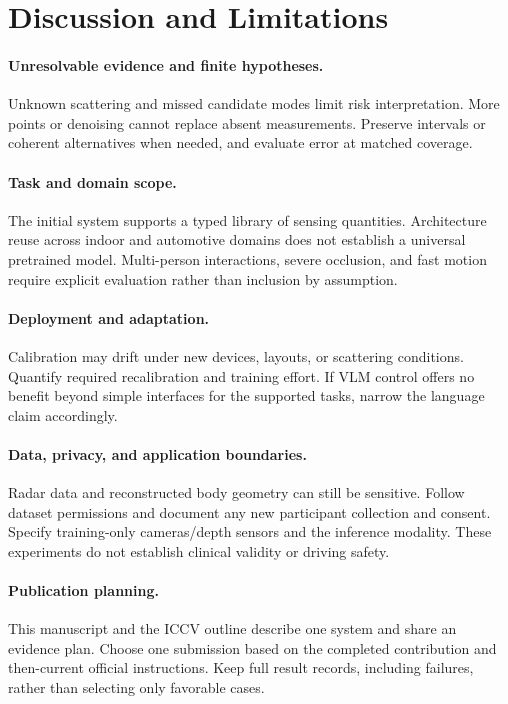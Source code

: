 \section{Discussion and Limitations}
\label{sec:discussion}
\paragraph{Unresolvable evidence and finite hypotheses.}
Unknown scattering and missed candidate modes limit risk interpretation. More points or denoising cannot replace absent measurements. Preserve intervals or coherent alternatives when needed, and evaluate error at matched coverage.

\paragraph{Task and domain scope.}
The initial system supports a typed library of sensing quantities. Architecture reuse across indoor and automotive domains does not establish a universal pretrained model. Multi-person interactions, severe occlusion, and fast motion require explicit evaluation rather than inclusion by assumption.

\paragraph{Deployment and adaptation.}
Calibration may drift under new devices, layouts, or scattering conditions. Quantify required recalibration and training effort. If VLM control offers no benefit beyond simple interfaces for the supported tasks, narrow the language claim accordingly.

\paragraph{Data, privacy, and application boundaries.}
Radar data and reconstructed body geometry can still be sensitive. Follow dataset permissions and document any new participant collection and consent. Specify training-only cameras/depth sensors and the inference modality. These experiments do not establish clinical validity or driving safety.

\paragraph{Publication planning.}
This manuscript and the ICCV outline describe one system and share an evidence plan. Choose one submission based on the completed contribution and then-current official instructions. Keep full result records, including failures, rather than selecting only favorable cases.
